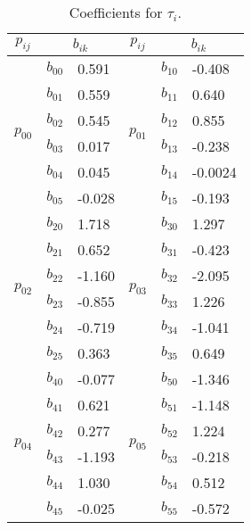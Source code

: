 \begin{table}
	\centering
	\caption{Coefficients for $\tau_i$.}
	\label{T:ti}
	\begin{tabular}{@{}cll|cll@{}}
		\hline
		$p_{ij}$                  & \multicolumn{2}{c}{$b_{ik}$} & $p_{ij}$ & \multicolumn{2}{c}{$b_{ik}$}\\
		\hline
		\multirow{6}{*}{$p_{00}$} & $b_{00}$  & 0.591
		&   \multirow{6}{*}{$p_{01}$} & $b_{10}$ & -0.408
		\\ %
		& $b_{01}$      & 0.559   &  	& $b_{11}$      & 0.640 \\ %
		& $b_{02}$      & 0.545   &	& $b_{12}$      & 0.855 \\ %
		& $b_{03}$      & 0.017   &	& $b_{13}$      & -0.238 \\ %
		& $b_{04}$      & 0.045  & 	& $b_{14}$      & -0.0024  \\ %
		& $b_{05}$      & -0.028   &	& $b_{15}$      & -0.193    \\ \hline
		\multirow{6}{*}{$p_{02}$} & $b_{20}$  & 1.718
		& \multirow{6}{*}{$p_{03}$} & $b_{30}$ & 1.297 \\ %
		& $b_{21}$      & 0.652   & & $b_{31}$      & -0.423  \\ %
		& $b_{22}$      & -1.160   & & $b_{32}$      & -2.095  \\ %
		& $b_{23}$      & -0.855    & & $b_{33}$      & 1.226   \\ %
		& $b_{24}$      & -0.719  & & $b_{34}$      & -1.041  \\ %
		& $b_{25}$      & 0.363   & & $b_{35}$      & 0.649  \\ \hline
		\multirow{6}{*}{$p_{04}$} & $b_{40}$      & -0.077  & \multirow{6}{*}{$p_{05}$} & $b_{50}$      & -1.346   \\ %
		& $b_{41}$      & 0.621     &  & $b_{51}$      & -1.148\\ %
		& $b_{42}$      & 0.277     &  & $b_{52}$      & 1.224\\ %
		& $b_{43}$      & -1.193    &  & $b_{53}$      & -0.218\\ %
		& $b_{44}$      & 1.030     &  & $b_{54}$      & 0.512\\ %
		& $b_{45}$      & -0.025   &  & $b_{55}$      & -0.572\\
		\hline
	\end{tabular}
\end{table}


